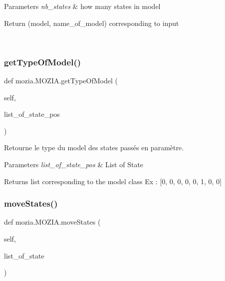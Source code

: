 \begin{DoxyParams}{Parameters}
{\em nb\+\_\+states} & how many states in model \begin{DoxyVerb}Return (model, name_of_model) corresponding to input\end{DoxyVerb}
 \\
\hline
\end{DoxyParams}
\mbox{\label{classmozia_1_1MOZIA_ae2319df142aaa0f183a8756b200ed2f8}} 
\subsubsection{\texorpdfstring{getTypeOfModel()}{getTypeOfModel()}}
{\footnotesize\ttfamily def mozia.\+M\+O\+Z\+I\+A.\+get\+Type\+Of\+Model (\begin{DoxyParamCaption}\item[{}]{self,  }\item[{}]{list\+\_\+of\+\_\+state\+\_\+pos }\end{DoxyParamCaption})}



Retourne le type du model des states passés en paramètre. 


\begin{DoxyParams}{Parameters}
{\em list\+\_\+of\+\_\+state\+\_\+pos} & List of State \\
\hline
\end{DoxyParams}
\begin{DoxyReturn}{Returns}
list corresponding to the model class Ex \+: \mbox{[}0, 0, 0, 0, 0, 1, 0, 0\mbox{]} 
\end{DoxyReturn}
\mbox{\label{classmozia_1_1MOZIA_a5e4d422fea8e9176715d5cd8e0cdfa80}} 
\subsubsection{\texorpdfstring{moveStates()}{moveStates()}}
{\footnotesize\ttfamily def mozia.\+M\+O\+Z\+I\+A.\+move\+States (\begin{DoxyParamCaption}\item[{}]{self,  }\item[{}]{list\+\_\+of\+\_\+state }\end{DoxyParamCaption})}



